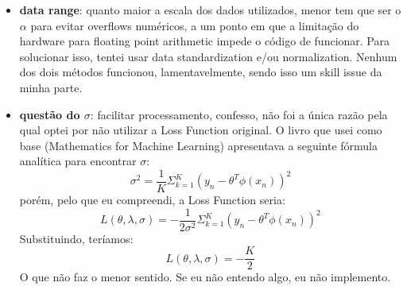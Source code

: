 \documentclass{article}
\begin{document}
\begin{itemize}
    \item \textbf{data range}: quanto maior a escala dos dados utilizados,
    menor tem que ser o $\alpha$ para evitar overflows numéricos, a
    um ponto em que a limitação do hardware para floating point 
    arithmetic impede o código de funcionar. Para solucionar isso,
    tentei usar data standardization e/ou normalization. Nenhum dos
    dois métodos funcionou, lamentavelmente, sendo isso um skill issue
    da minha parte.
    \item \textbf{questão do $\sigma$}: facilitar processamento,
    confesso, não foi a única razão pela qual optei por não 
    utilizar a Loss Function original. O livro que usei como base 
    (Mathematics for Machine Learning) apresentava a seguinte fórmula
    analítica para encontrar $\sigma$:
    \begin{equation}
        \sigma^{2} = \frac{1}{K}\Sigma_{k=1}^{K}
        (y_{n} - \theta^{T}\phi(x_{n}))^{2}
    \end{equation}
    porém, pelo que eu compreendi, a Loss Function seria:
    \begin{equation}
        L(\theta,\lambda,\sigma) = -\frac{1}{2\sigma^{2}}
        \Sigma_{k=1}^{K}
        (y_{n} - \theta^{T}\phi(x_{n}))^{2}
    \end{equation}
    Substituindo, teríamos:
    \begin{equation}
        L(\theta,\lambda,\sigma) = -\frac{K}{2}
    \end{equation}
    O que não faz o menor sentido. Se eu não entendo algo, eu não
    implemento.
\end{itemize}
\end{document}
